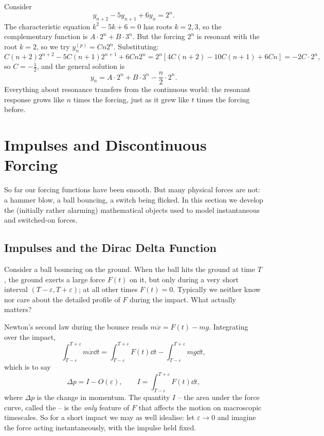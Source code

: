 \begin{example}
	Consider
	$$
	y_{n + 2} - 5 y_{n + 1} + 6 y_n = 2^n.
	$$
	The characteristic equation $k^2 - 5k + 6 = 0$ has roots $k = 2, 3$, so the complementary function is $A \cdot 2^n + B \cdot 3^n$. But the forcing $2^n$ is resonant with the root $k = 2$, so we try $y_n^{(p)} = C n 2^n$. Substituting:
	$$
	C(n + 2)2^{n + 2} - 5C(n+1)2^{n + 1} + 6Cn2^n = 2^n \left[4C(n + 2) - 10C(n + 1) + 6Cn\right] = -2C \cdot 2^n,
	$$
	so $C = -\frac12$, and the general solution is
	$$
	y_n = A \cdot 2^n + B \cdot 3^n - \frac{n}{2} \cdot 2^n.
	$$
	Everything about resonance transfers from the continuous world: the resonant response grows like $n$ times the forcing, just as it grew like $t$ times the forcing before.
\end{example}

\section{Impulses and Discontinuous Forcing}

So far our forcing functions have been smooth. But many physical forces are not: a hammer blow, a ball bouncing, a switch being flicked. In this section we develop the (initially rather alarming) mathematical objects used to model instantaneous and switched-on forces.

\subsection{Impulses and the Dirac Delta Function}

Consider a ball bouncing on the ground. When the ball hits the ground at time $T$, the ground exerts a large force $F(t)$ on it, but only during a very short interval $(T - \varepsilon, T + \varepsilon)$; at all other times $F(t) = 0$. Typically we neither know nor care about the detailed profile of $F$ during the impact. What actually matters?

Newton's second law during the bounce reads $m \ddot x = F(t) - mg$. Integrating over the impact,
$$
\int_{T - \varepsilon}^{T + \varepsilon} m \ddot x \dd t = \int_{T - \varepsilon}^{T + \varepsilon} F(t) \dd t - \int_{T - \varepsilon}^{T + \varepsilon} mg \dd t,
$$
which is to say
$$
\Delta p = I - O(\varepsilon), \qquad I = \int_{T - \varepsilon}^{T + \varepsilon} F(t) \dd t,
$$
where $\Delta p$ is the change in momentum. The quantity $I$ -- the area under the force curve, called the  -- is the \emph{only} feature of $F$ that affects the motion on macroscopic timescales. So for a short impact we may as well idealise: let $\varepsilon \to 0$ and imagine the force acting instantaneously, with the impulse held fixed.

